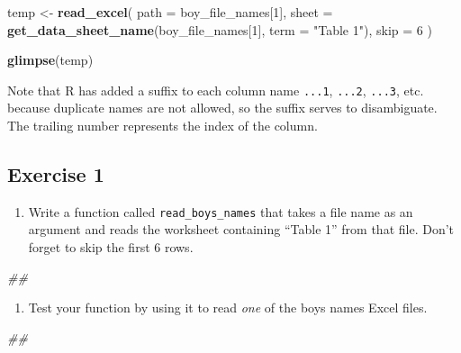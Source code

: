 \documentclass[
]{book}
\newenvironment{Shaded}{\begin{snugshade}}{\end{snugshade}}
\newcommand{\CommentTok}[1]{\textcolor[rgb]{0.56,0.35,0.01}{\textit{#1}}}
\newcommand{\DataTypeTok}[1]{\textcolor[rgb]{0.13,0.29,0.53}{#1}}
\newcommand{\DecValTok}[1]{\textcolor[rgb]{0.00,0.00,0.81}{#1}}
\newcommand{\KeywordTok}[1]{\textcolor[rgb]{0.13,0.29,0.53}{\textbf{#1}}}
\newcommand{\NormalTok}[1]{#1}
\newcommand{\StringTok}[1]{\textcolor[rgb]{0.31,0.60,0.02}{#1}}
\providecommand{\tightlist}{%
  \setlength{\itemsep}{0pt}\setlength{\parskip}{0pt}}
\begin{document}
\begin{Shaded}
\begin{Highlighting}[]
\NormalTok{temp <-}\StringTok{ }\KeywordTok{read_excel}\NormalTok{(}
  \DataTypeTok{path =}\NormalTok{ boy_file_names[}\DecValTok{1}\NormalTok{],}
  \DataTypeTok{sheet =} \KeywordTok{get_data_sheet_name}\NormalTok{(boy_file_names[}\DecValTok{1}\NormalTok{], }\DataTypeTok{term =} \StringTok{"Table 1"}\NormalTok{),}
  \DataTypeTok{skip =} \DecValTok{6}
\NormalTok{)}

\KeywordTok{glimpse}\NormalTok{(temp)}
\end{Highlighting}
\end{Shaded}

Note that R has added a suffix to each column name \texttt{...1}, \texttt{...2},
\texttt{...3}, etc. because duplicate names are not allowed, so the suffix serves
to disambiguate. The trailing number represents the index of the column.

\hypertarget{exercise-1-3}{%
\subsection{Exercise 1}\label{exercise-1-3}}

\begin{enumerate}
\def\labelenumi{\arabic{enumi}.}
\tightlist
\item
  Write a function called \texttt{read\_boys\_names} that takes a file name as an argument
  and reads the worksheet containing ``Table 1'' from that file. Don't forget
  to skip the first 6 rows.
\end{enumerate}

\begin{Shaded}
\begin{Highlighting}[]
\CommentTok{## }
\end{Highlighting}
\end{Shaded}

\begin{enumerate}
\def\labelenumi{\arabic{enumi}.}
\setcounter{enumi}{1}
\tightlist
\item
  Test your function by using it to read \emph{one} of the boys names
  Excel files.
\end{enumerate}

\begin{Shaded}
\begin{Highlighting}[]
\CommentTok{## }
\end{Highlighting}
\end{Shaded}
\end{document}
